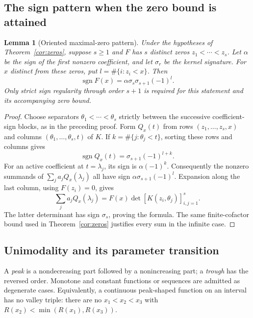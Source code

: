 \documentclass[11pt,a4paper]{article}
\newtheorem{lemma}[theorem]{Lemma}
\theoremstyle{definition}
\theoremstyle{remark}
\DeclareMathOperator{\sgn}{sgn}
\begin{document}
\subsection{The sign pattern when the zero bound is attained}

\begin{lemma}[Oriented maximal-zero pattern]\label{app:orientation}
Under the hypotheses of Theorem~\ref{cor:zeros}, suppose \(s\ge1\)
and \(F\) has \(s\) distinct zeros \(z_1<\cdots<z_s\). Let
\(\alpha\) be the sign of the first nonzero coefficient, and let
\(\sigma_r\) be the kernel signature. For \(x\) distinct from these
zeros, put \(l=\#\{i:z_i<x\}\). Then
\begin{equation}\label{app:oriented-sign}
 \sgn F(x)=\alpha\sigma_s\sigma_{s+1}(-1)^l.
\end{equation}
Only strict sign regularity through order \(s+1\) is required for
this statement and its accompanying zero bound.
\end{lemma}

\begin{proof}
Choose separators \(\theta_1<\cdots<\theta_s\) strictly between
the successive coefficient-sign blocks, as in the preceding proof.
Form \(Q_x(t)\) from rows \((z_1,\ldots,z_s,x)\) and columns
\((\theta_1,\ldots,\theta_s,t)\) of \(K\). If
\(k=\#\{j:\theta_j<t\}\), sorting these rows and columns gives
\[
 \sgn Q_x(t)=\sigma_{s+1}(-1)^{l+k}.
\]
For an active coefficient at \(t=\lambda_j\), its sign is
\(\alpha(-1)^k\). Consequently the nonzero summands of
\(\sum_j a_jQ_x(\lambda_j)\) all have sign
\(\alpha\sigma_{s+1}(-1)^l\). Expansion along the last column,
using \(F(z_i)=0\), gives
\[
 \sum_j a_jQ_x(\lambda_j)
 =F(x)\det[K(z_i,\theta_j)]_{i,j=1}^s.
\]
The latter determinant has sign \(\sigma_s\), proving the formula.
The same finite-cofactor bound used in Theorem~\ref{cor:zeros}
justifies every sum in the infinite case.
\end{proof}

\subsection{Unimodality and its parameter transition}

A \emph{peak} is a nondecreasing part followed by a nonincreasing
part; a \emph{trough} has the reversed order. Monotone and constant
functions or sequences are admitted as degenerate cases. Equivalently,
a continuous peak-shaped function on an interval has no valley triple:
there are no \(x_1<x_2<x_3\) with
\(R(x_2)<\min(R(x_1),R(x_3))\).
\end{document}
